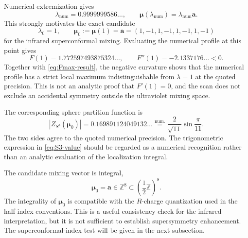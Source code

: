 \documentclass[11pt,a4paper]{article}
\numberwithin{equation}{section}
\begin{document}
Numerical extremization gives
\begin{equation}
  \lambda_{\mathrm{num}}=0.9999999586\ldots,
  \qquad
  \boldsymbol\mu(\lambda_{\mathrm{num}})
  =\lambda_{\mathrm{num}}\boldsymbol a.
  \label{eq:Fmax-result}
\end{equation}
This strongly motivates the exact candidate
\begin{equation}
  \lambda_0=1,
  \qquad
  \boldsymbol\mu_0:=\boldsymbol\mu(1)=\boldsymbol a
  =(1,-1,1,-1,1,-1,1,-1)
  \label{eq:exact-mixing-candidate}
\end{equation}
for the infrared superconformal mixing.  Evaluating the numerical profile at this point gives
\begin{equation}
  F(1)=1.772597493875324\ldots,
  \qquad
  F''(1)=-2.1337176\ldots<0.
  \label{eq:Fmax-curvature}
\end{equation}
Together with \eqref{eq:Fmax-result}, the negative curvature shows that the numerical profile has a strict local maximum indistinguishable from $\lambda=1$ at the quoted precision.  This is not an analytic proof that $F'(1)=0$, and the scan does not exclude an accidental symmetry outside the ultraviolet mixing space.

The corresponding sphere partition function is
\begin{equation}
  \left|Z_{S^3}(\boldsymbol\mu_0)\right|
  =0.169891124049132\ldots
  \stackrel{\mathrm{num.}}{=}
  \frac{2}{\sqrt{11}}\sin\frac{\pi}{11}.
  \label{eq:S3-value}
\end{equation}
The two sides agree to the quoted numerical precision.  The trigonometric expression in \eqref{eq:S3-value} should be regarded as a numerical recognition rather than an analytic evaluation of the localization integral.

The candidate mixing vector is integral,
\begin{equation}
  \boldsymbol\mu_0=\boldsymbol a\in\mathbb Z^8
  \subset \left(\frac12\mathbb Z\right)^8.
  \label{eq:half-integral-mixing}
\end{equation}
The integrality of $\boldsymbol\mu_0$ is compatible with the $R$-charge quantization used in the half-index conventions.  This is a useful consistency check for the infrared interpretation, but it is not sufficient to establish supersymmetry enhancement.  The superconformal-index test will be given in the next subsection.
\end{document}
